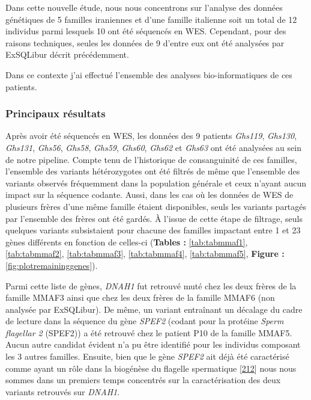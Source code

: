 \documentclass[12pt,a4paper,twoside]{ugathesis}
\theoremstyle{definition}
\theoremstyle{definition}
\theoremstyle{definition}
\theoremstyle{remark}
\begin{document}
Dans cette nouvelle étude, nous nous concentrons sur l'analyse des
données génétiques de 5 familles iraniennes et d'une famille italienne
soit un total de 12 individus parmi lesquels 10 ont été séquencés en
WES. Cependant, pour des raisons techniques, seules les données de 9
d'entre eux ont été analysées par ExSQLibur décrit précédemment.

Dans ce contexte j'ai effectué l'ensemble des analyses bio-informatiques
de ces patients.

\newpage



\newpage

\subsubsection{Principaux résultats}\label{principaux-resultats-2}

Après avoir été séquencés en WES, les données des 9 patients
\emph{Ghs119}, \emph{Ghs130}, \emph{Ghs131}, \emph{Ghs56}, \emph{Ghs58},
\emph{Ghs59}, \emph{Ghs60}, \emph{Ghs62} et \emph{Ghs63} ont été
analysées au sein de notre pipeline. Compte tenu de l'historique de
consanguinité de ces familles, l'ensemble des variants hétérozygotes ont
été filtrés de même que l'ensemble des variants observés fréquemment
dans la population générale et ceux n'ayant aucun impact sur la séquence
codante. Aussi, dans les cas où les données de WES de plusieurs frères
d'une même famille étaient disponibles, seuls les variants partagés par
l'ensemble des frères ont été gardés. À l'issue de cette étape de
filtrage, seuls quelques variants subsistaient pour chacune des familles
impactant entre 1 et 23 gènes différents en fonction de celles-ci
(\textbf{Tables :} \ref{tab:tabmmaf1}, \ref{tab:tabmmaf2},
\ref{tab:tabmmaf3}, \ref{tab:tabmmaf4}, \ref{tab:tabmmaf5},
\textbf{Figure : }\ref{fig:plotremaininggenes}).

Parmi cette liste de gènes, \emph{DNAH1} fut retrouvé muté chez les deux
frères de la famille MMAF3 ainsi que chez les deux frères de la famille
MMAF6 (non analysée par ExSQLibur). De même, un variant entraînant un
décalage du cadre de lecture dans la séquence du gène \emph{SPEF2}
(codant pour la protéine \emph{Sperm flagellar 2} (SPEF2)) a été
retrouvé chez le patient P10 de la famille MMAF5. Aucun autre candidat
évident n'a pu être identifié pour les individus composant les 3 autres
familles. Ensuite, bien que le gène \emph{SPEF2} ait déjà été
caractérisé comme ayant un rôle dans la biogénèse du flagelle
spermatique {[}\protect\hyperlink{ref-Lehti2017}{212}{]} nous nous
sommes dans un premiers temps concentrés sur la caractérisation des deux
variants retrouvés sur \emph{DNAH1}.
\end{document}

